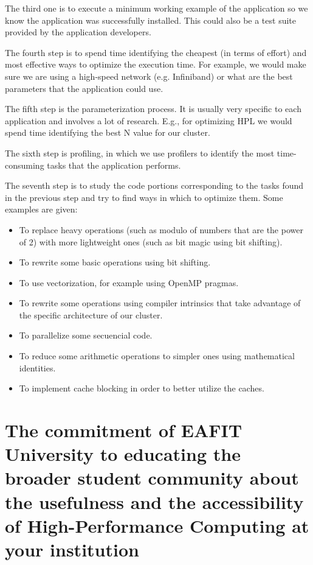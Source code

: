 \documentclass[11pt,a4paper,twocolumn]{article}
\begin{document}
The third one is to execute a minimum working example of the application so we know the application was successfully installed. This could also be a test suite provided by the application developers.

The fourth step is to spend time identifying the cheapest (in terms of effort) and most effective ways to optimize the execution time. For example, we would make sure we are using a high-speed network (e.g. Infiniband) or what are the best parameters that the application could use.

The fifth step is the parameterization process. It is usually very specific to each application and involves a lot of research. E.g., for optimizing HPL we would spend time identifying the best N value for our cluster.

The sixth step is profiling, in which we use profilers to identify the most time-consuming tasks that the application performs.

The seventh step is to study the code portions corresponding to the tasks found in the previous step and try to find ways in which to optimize them. Some examples are given:

\begin{itemize}
    \item To replace heavy operations (such as modulo of numbers that are the power of 2) with more lightweight ones (such as bit magic using bit shifting).
    \item To rewrite some basic operations using bit shifting.
    \item To use vectorization, for example using OpenMP pragmas.
    \item To rewrite some operations using compiler intrinsics that take advantage of the specific architecture of our cluster.
    \item To parallelize some secuencial code.
    \item To reduce some arithmetic operations to simpler ones using mathematical identities.
    \item To implement cache blocking in order to better utilize the caches.
\end{itemize}

\section{The commitment of EAFIT University to educating the broader student community about the usefulness and the accessibility of High-Performance Computing at your institution}
\end{document}
